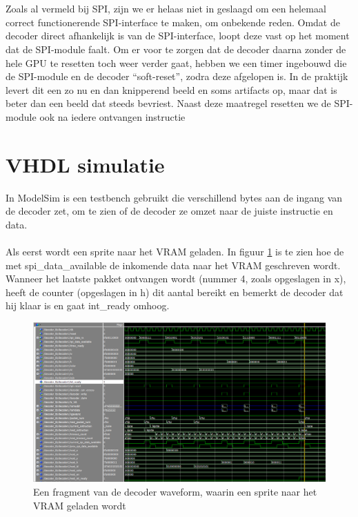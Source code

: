 \documentclass{scrartcl} %
\begin{document}
\\
\\
Zoals al vermeld bij SPI, zijn we er helaas niet in geslaagd om een helemaal correct functionerende SPI-interface te maken, om onbekende reden. Omdat de decoder direct afhankelijk is van de SPI-interface, loopt deze vast op het moment dat de SPI-module faalt. Om er voor te zorgen dat de decoder daarna zonder de hele GPU te resetten toch weer verder gaat, hebben we een timer ingebouwd die de SPI-module en de decoder ``soft-reset'', zodra deze afgelopen is. In de praktijk levert dit een zo nu en dan knipperend beeld en soms artifacts op, maar dat is beter dan een beeld dat steeds bevriest. Naast deze maatregel resetten we de SPI-module ook na iedere ontvangen instructie

\section{VHDL simulatie}
In ModelSim is een testbench gebruikt die verschillend bytes aan de ingang van de decoder zet, om te zien of de decoder ze omzet naar de juiste instructie en data.
\\\\
Als eerst wordt een sprite naar het VRAM geladen. In figuur \ref{fig:decoder-modelsim-lsprite} is te zien hoe de met spi\_data\_available de inkomende data naar het VRAM geschreven wordt. Wanneer het laatste pakket ontvangen wordt (nummer 4, zoals opgeslagen in x), heeft de counter (opgeslagen in h) dit aantal bereikt en bemerkt de decoder dat hij klaar is en gaat int\_ready omhoog.

\begin{figure}[H]
	\centering
	\includegraphics[width=\textwidth]{resource/decoder-modelsim-lsprite.png}
	\caption{Een fragment van de decoder waveform, waarin een sprite naar het VRAM geladen wordt}
	\label{fig:decoder-modelsim-lsprite}
\end{figure}
\end{document}
